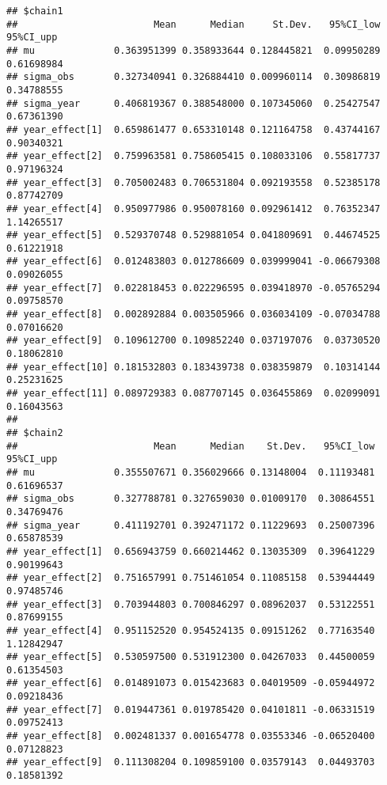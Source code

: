 \documentclass[
]{article}
\newenvironment{Shaded}{\begin{snugshade}}{\end{snugshade}}
\newcommand{\FunctionTok}[1]{\textcolor[rgb]{0.13,0.29,0.53}{\textbf{#1}}}
\newcommand{\NormalTok}[1]{#1}
\newcommand{\SpecialCharTok}[1]{\textcolor[rgb]{0.81,0.36,0.00}{\textbf{#1}}}
\begin{document}
\begin{Shaded}
\end{Shaded}

\begin{verbatim}
## $chain1
##                        Mean      Median     St.Dev.   95%CI_low  95%CI_upp
## mu              0.363951399 0.358933644 0.128445821  0.09950289 0.61698984
## sigma_obs       0.327340941 0.326884410 0.009960114  0.30986819 0.34788555
## sigma_year      0.406819367 0.388548000 0.107345060  0.25427547 0.67361390
## year_effect[1]  0.659861477 0.653310148 0.121164758  0.43744167 0.90340321
## year_effect[2]  0.759963581 0.758605415 0.108033106  0.55817737 0.97196324
## year_effect[3]  0.705002483 0.706531804 0.092193558  0.52385178 0.87742709
## year_effect[4]  0.950977986 0.950078160 0.092961412  0.76352347 1.14265517
## year_effect[5]  0.529370748 0.529881054 0.041809691  0.44674525 0.61221918
## year_effect[6]  0.012483803 0.012786609 0.039999041 -0.06679308 0.09026055
## year_effect[7]  0.022818453 0.022296595 0.039418970 -0.05765294 0.09758570
## year_effect[8]  0.002892884 0.003505966 0.036034109 -0.07034788 0.07016620
## year_effect[9]  0.109612700 0.109852240 0.037197076  0.03730520 0.18062810
## year_effect[10] 0.181532803 0.183439738 0.038359879  0.10314144 0.25231625
## year_effect[11] 0.089729383 0.087707145 0.036455869  0.02099091 0.16043563
## 
## $chain2
##                        Mean      Median    St.Dev.   95%CI_low  95%CI_upp
## mu              0.355507671 0.356029666 0.13148004  0.11193481 0.61696537
## sigma_obs       0.327788781 0.327659030 0.01009170  0.30864551 0.34769476
## sigma_year      0.411192701 0.392471172 0.11229693  0.25007396 0.65878539
## year_effect[1]  0.656943759 0.660214462 0.13035309  0.39641229 0.90199643
## year_effect[2]  0.751657991 0.751461054 0.11085158  0.53944449 0.97485746
## year_effect[3]  0.703944803 0.700846297 0.08962037  0.53122551 0.87699155
## year_effect[4]  0.951152520 0.954524135 0.09151262  0.77163540 1.12842947
## year_effect[5]  0.530597500 0.531912300 0.04267033  0.44500059 0.61354503
## year_effect[6]  0.014891073 0.015423683 0.04019509 -0.05944972 0.09218436
## year_effect[7]  0.019447361 0.019785420 0.04101811 -0.06331519 0.09752413
## year_effect[8]  0.002481337 0.001654778 0.03553346 -0.06520400 0.07128823
## year_effect[9]  0.111308204 0.109859100 0.03579143  0.04493703 0.18581392

\end{verbatim}
\end{document}
